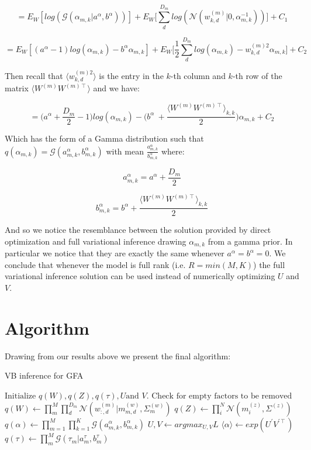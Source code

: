 \documentclass{article}
\begin{document}
$$ = E_{W}[log(\mathcal{G}(\alpha_{m,k}|a^\alpha,b^\alpha))] +  E_{W}\bigg[\sum_{d}^{D_m}{log(\mathcal{N}(w_{k,d}^{(m)}|0, \alpha_{m,k}^{-1}))}\bigg]+C_1$$

$$= E_W[(a^\alpha-1)log(\alpha_{m,k}) - b^\alpha\alpha_{m,k}] + E_W\bigg[\frac{1}{2}\sum_d^{D_m}{log(\alpha_{m,k}) - w_{k,d}^{(m)2} \alpha_{m,k} }\bigg] + C_2$$

Then recall that $\langle w_{k,d}^{(m)2}\rangle$ is the entry in the $k$-th column and $k$-th row of the matrix $\langle W^{(m)}W^{(m)\intercal}\rangle$ and we have:

$$= \bigg(a^\alpha+\frac{D_m}{2}-1 \bigg)log(\alpha_{m,k}) - \bigg(b^\alpha\ + \frac{\langle W^{(m)}W^{(m)\intercal}\rangle_{k,k}}{2} \bigg) \alpha_{m,k} + C_2$$

Which has the form of a Gamma distribution such that $q(\alpha_{m,k}) = \mathcal{G}(a_{m,k}^\alpha, b_{m,k}^\alpha)$ with mean $\frac{a_{m,k}^\alpha}{b_{m,k}^\alpha}$ where:

$$a_{m,k}^\alpha = a^\alpha+\frac{D_m}{2}$$

$$b_{m,k}^\alpha = b^\alpha + \frac{\langle W^{(m)}W^{(m)\intercal}\rangle_{k,k}}{2}$$

And so we notice the resemblance between the solution provided by direct optimization and full variational inference drawing $\alpha_{m,k}$ from a gamma prior. In particular we notice that they are exactly the same whenever $a^\alpha = b^\alpha = 0$. We conclude that whenever the model is full rank (i.e. $R=min(M,K)$) the full variational inference solution can be used instead of numerically optimizing $U$ and $V$.

\section*{Algorithm}

Drawing from our results above we present the final algorithm:

\makeatletter
\def\BState{\State\hskip-\ALG@thistlm}
\makeatother

\begin{algorithm}[H]
\caption{VB inference for GFA}\label{euclid}
\begin{algorithmic}[1]
\State $\text{Initialize } q(W), q(Z), q(\tau), U \text{and } V.$
\State $\text{Check for empty factors to be removed}$
\State $q(W) \gets \prod_m^M{\prod_d^{D_m}{\mathcal{N}(w_{:,d}^{(m)}|m_{m,d}^{(w)}, \Sigma_m^{(w)})}}$
\State $q(Z) \gets \prod_i^N{\mathcal{N}(m_i^{(z)},\Sigma^{(z)})}$
\State $q(\alpha) \gets \prod_{m=1}^M{\prod_{k=1}^K{\mathcal{G}(a_{m,k}^\alpha, b_{m,k}^\alpha)}}$
\Else{}
\State $U, V \gets argmax_{U,V} L$
\State $\langle \alpha \rangle \gets exp(U^\prime V^{\prime \intercal})$
\EndIf
\State $q(\tau) \gets \prod_m^M{\mathcal{G}(\tau_m|a_m^\tau,b_m^\tau)}$
\EndWhile
\end{algorithmic}
\end{algorithm}
\end{document}
